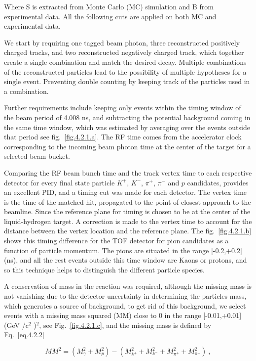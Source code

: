 Where S is extracted from Monte Carlo (MC) simulation and B from experimental data. All the following cuts are applied on both MC and experimental data.
\par We start by requiring one tagged beam photon, three reconstructed positively charged tracks, and two reconstructed negatively charged track, which together create a single combination and match the desired decay. Multiple combinations of the reconstructed particles lead to the possibility of multiple hypotheses for a single event. Preventing double counting by keeping track of the particles used in a combination.
\par Further requirements include keeping only events within the timing window of the beam period of 4.008 ns, and subtracting the potential background coming in the same time window, which was estimated by averaging over the events outside that period see fig.~\ref{fig.4.2.1.a}. The RF time comes from the accelerator clock corresponding to the incoming beam photon time at the center of the target for a selected beam bucket.
\par Comparing the RF beam bunch time and the track vertex time to each respective detector for every final state particle $K^{+}$, $K^{-}$, $\pi^{+}$, $\pi^{-}$ and $p$ candidates, provides an excellent PID, and a timing cut was made for each detector. The vertex time is the time of the matched hit, propagated to the point of closest approach to the beamline. Since the reference plane for timing is chosen to be at the center of the liquid-hydrogen target. A correction is made to the vertex time to account for the distance between the vertex location and the reference plane. The fig.~\ref{fig.4.2.1.b} shows this timing difference for the TOF detector for pion candidates as a function of particle momentum. The pions are situated in the range [-0.2,+0.2] (ns), and all the rest events outside this time window are Kaons or protons, and so this technique helps to distinguish the different particle species.
\par A conservation of mass in the reaction was required, although the missing mass is not vanishing due to the detector uncertainty in determining the particles mass, which generates a source of background, to get rid of this background, we select events with a missing mass squared (MM) close to 0 in the range [-0.01,+0.01] (GeV /c$^2$ )$^2$, see Fig.~\ref{fig.4.2.1.c}, and the missing mass is defined by Eq.~\ref{eq.4.2.2}

\begin{equation}
    \label{eq.4.2.2}
    MM^2 = (M^2_\gamma + M^2_p) - (M^2_{k^+} + M^2_{k^-} + M^2_{\pi^+} + M^2_{\pi^-})~,
\end{equation}

